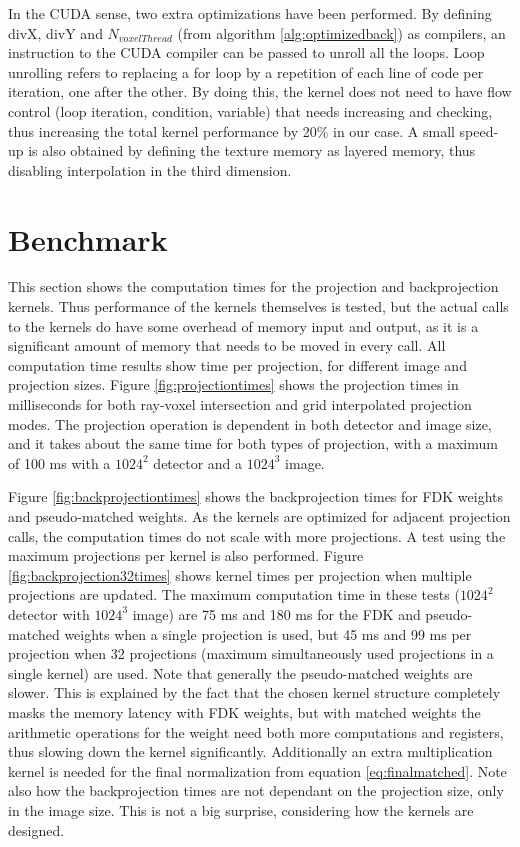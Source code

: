 In the CUDA sense, two extra optimizations have been performed. By defining divX, divY and $N_{voxelThread}$ (from algorithm \ref{alg:optimizedback}) as compilers, an instruction to the CUDA compiler can be passed to unroll all the loops. Loop unrolling refers to replacing a for loop by a repetition of each line of code per iteration, one after the other. By doing this, the kernel does not need to have flow control (loop iteration, condition, variable) that needs increasing and checking, thus increasing the total kernel performance by 20\% in our case. A small speed-up is also obtained by defining the texture memory as layered memory, thus disabling interpolation in the third dimension.


\FloatBarrier
\section{Benchmark}\label{sec:speed}

This section shows the computation times for the projection and backprojection kernels. Thus performance of the kernels themselves is tested, but the actual calls to the kernels do have some overhead of memory input and output, as it is a significant amount of memory that needs to be moved in every call. All computation time results show time per projection, for different image and projection sizes. Figure \ref{fig:projectiontimes} shows the projection times in milliseconds for both ray-voxel intersection and grid interpolated projection modes. The projection operation is dependent in both detector and image size, and it takes about the same time for both types of projection, with a maximum of 100 ms with a $1024^2$ detector and a $1024^3$ image.


 Figure \ref{fig:backprojectiontimes} shows the backprojection times for FDK weights and pseudo-matched weights. As the kernels are optimized for adjacent projection calls, the computation times do not scale with more projections. A test using the maximum projections per kernel is also performed. Figure \ref{fig:backprojection32times} shows kernel times per projection when multiple projections are updated. The maximum computation time in these tests ($1024^2$ detector with $1024^3$ image) are 75 ms and 180 ms for the FDK and pseudo-matched weights when a single projection is used, but 45 ms and 99 ms per projection when 32 projections (maximum simultaneously used projections in a single kernel) are used. Note that generally the pseudo-matched weights are slower. This is explained by the fact that the chosen kernel structure completely masks the memory latency with FDK weights, but with matched weights the arithmetic operations for the weight need both more computations and registers, thus slowing down the kernel significantly. Additionally an extra multiplication kernel is needed for the final normalization from equation \ref{eq:finalmatched}. Note also how the backprojection times are not dependant on the projection size, only in the image size. This is not a big surprise, considering how the kernels are designed.
 
